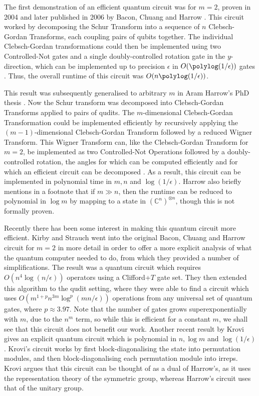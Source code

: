 The first demonstration of an efficient quantum circuit was for $m=2$, proven in 2004 and later published in 2006 by Bacon, Chuang and Harrow \cite{bacon2004}. This circuit worked by decomposing the Schur Transform into a sequence of $n$ Clebsch-Gordan Transforms, each coupling pairs of qubits together. The individual Clebsch-Gordan transformations could then be implemented using two Controlled-Not gates and a single doubly-controlled rotation gate in the $y$-direction, which can be implemented up to precision $\epsilon$ in $O(\polylog(1/\epsilon))$ gates \cite{dawson2006, nielsen2010}. Thus, the overall runtime of this circuit was $O(n\polylog(1/\epsilon))$.

This result was subsequently generalised to arbitrary $m$ in Aram Harrow's PhD thesis \cite{harrow2005, bacon2007}. Now the Schur transform was decomposed into Clebsch-Gordan Transforms applied to pairs of qudits. The $m$-dimensional Clebsch-Gordan Transformation could be implemented efficiently by recursively applying the $(m-1)$-dimensional Clebsch-Gordan Transform followed by a reduced Wigner Transform. This Wigner Transform can, like the Clebsch-Gordan Transform for $m=2$, be implemented as two Controlled-Not Operations followed by a doubly-controlled rotation, the angles for which can be computed efficiently and for which an efficient circuit can be decomposed \cite{nielsen2010}. As a result, this circuit can be implemented in polynomial time in $m, n$ and $\log(1/\epsilon)$. Harrow also briefly mentions in a footnote that if $m \gg n$, then the runtime can be reduced to polynomial in $\log m$ by mapping to a state in $(\mathbb{C}^n)^{\otimes n}$, though this is not formally proven.

Recently there has been some interest in making this quantum circuit more efficient. Kirby and Strauch \cite{kirby2018} went into the original Bacon, Chuang and Harrow circuit for $m=2$ in more detail in order to offer a more explicit  analysis of what the quantum computer needed to do, from which they provided a number of simplifications. The result was a quantum circuit which requires $O(n^4\log(n/\epsilon))$ operators using a Clifford+$T$ gate set. They then extended this algorithm to the qudit setting, where they were able to find a circuit which uses $O(m^{1+p}n^{3m}\log^p(mn/\epsilon))$ operations from any universal set of quantum gates, where $p\approx 3.97$. Note that the number of gates grows superexponentially with $m$, due to the $n^m$ term, so while this is efficient for a constant $m$, we shall see that this circuit does not benefit our work. Another recent result by Krovi \cite{Krovi2019} gives an explicit quantum circuit which is polynomial in $n, \log m$ and $\log(1/\epsilon)$. Krovi's circuit works by first block-diagonalising the state into permutation modules, and then block-diagonalising each permutation module into irreps. Krovi argues that this circuit can be thought of as a dual  of Harrow's, as it uses the representation theory of the symmetric group, whereas Harrow's circuit uses that of the unitary group.

